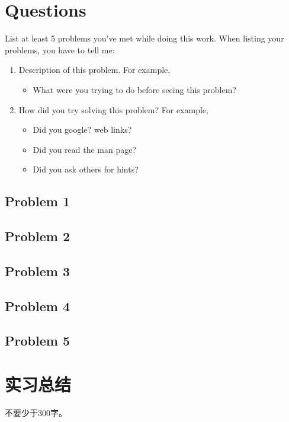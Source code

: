 \documentclass{swfulabreport}
\begin{document}
\section{Questions}\label{questions}

List at least 5 problems you've met while doing this work. When listing
your problems, you have to tell me:

\begin{enumerate}
\def\labelenumi{\arabic{enumi}.}
\item
  Description of this problem. For example,

  \begin{itemize}
  \tightlist
  \item
    What were you trying to do before seeing this problem?
  \end{itemize}
\item
  How did you try solving this problem? For example,

  \begin{itemize}
  \tightlist
  \item
    Did you google? web links?
  \item
    Did you read the man page?
  \item
    Did you ask others for hints?
  \end{itemize}
\end{enumerate}

\subsection{Problem 1}\label{problem-1}

\subsection{Problem 2}\label{problem-2}

\subsection{Problem 3}\label{problem-3}

\subsection{Problem 4}\label{problem-4}

\subsection{Problem 5}\label{problem-5}

\section{实习总结}\label{ux5b9eux4e60ux603bux7ed3}

不要少于300字。

\comments %
\end{document}
